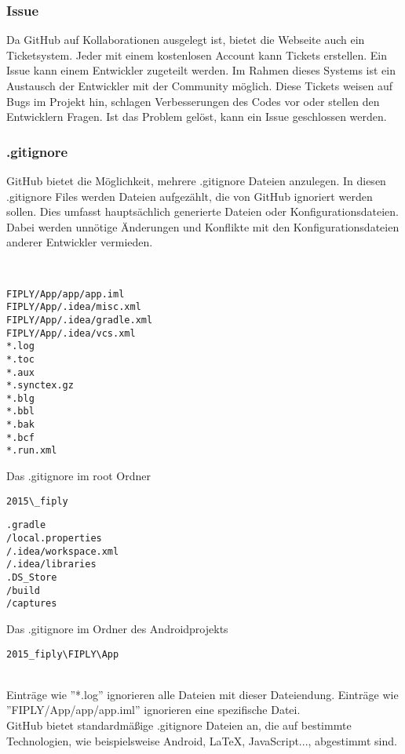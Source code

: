 \documentclass[FIPLY_base.tex]{subfiles}
\begin{document}
\subsubsection{Issue}
Da GitHub auf Kollaborationen ausgelegt ist, bietet die Webseite auch ein Ticketsystem.
Jeder mit einem kostenlosen Account kann Tickets erstellen. Ein Issue kann einem Entwickler zugeteilt werden.
Im Rahmen dieses Systems ist ein Austausch der Entwickler mit der Community möglich.
Diese Tickets weisen auf Bugs im Projekt hin, schlagen Verbesserungen des Codes vor oder stellen den Entwicklern Fragen.
Ist das Problem gelöst, kann ein Issue geschlossen werden.

\subsubsection{.gitignore}
GitHub bietet die Möglichkeit, mehrere .gitignore Dateien anzulegen.
In diesen .gitignore Files werden Dateien aufgezählt, die von GitHub ignoriert werden sollen. 
Dies umfasst hauptsächlich generierte Dateien oder Konfigurationsdateien.
Dabei werden unnötige Änderungen und Konflikte mit den Konfigurationsdateien anderer Entwickler vermieden. 

\ \\
\begin{minipage}{.45\textwidth}
\begin{lstlisting}
FIPLY/App/app/app.iml
FIPLY/App/.idea/misc.xml
FIPLY/App/.idea/gradle.xml
FIPLY/App/.idea/vcs.xml
*.log
*.toc
*.aux
*.synctex.gz
*.blg
*.bbl
*.bak
*.bcf
*.run.xml
\end{lstlisting}
Das .gitignore im root Ordner \begin{verbatim}2015\_fiply\end{verbatim}
\end{minipage}\hfill
\begin{minipage}{.45\textwidth}
\begin{lstlisting}
.gradle
/local.properties
/.idea/workspace.xml
/.idea/libraries
.DS_Store
/build
/captures
\end{lstlisting}
Das .gitignore im Ordner des Androidprojekts \begin{verbatim}2015_fiply\FIPLY\App\end{verbatim} 
\end{minipage}
\ \\
Einträge wie ''*.log'' ignorieren alle Dateien mit dieser Dateiendung. \newline
Einträge wie ''FIPLY/App/app/app.iml'' ignorieren eine spezifische Datei.
\ \\
GitHub bietet standardmäßige .gitignore Dateien an, die auf bestimmte Technologien, wie beispielsweise Android, LaTeX, JavaScript...,  abgestimmt sind.
\end{document}
